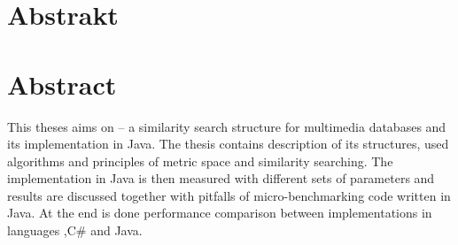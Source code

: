 \section*{Abstrakt}
\section*{Abstract}
This theses aims on \MIndex{} -- a similarity search structure for multimedia databases and its implementation in Java.
The thesis contains description of \MIndex{} its structures, used algorithms and principles of metric space and similarity searching.
The implementation in Java is then measured with different sets of parameters and results are discussed together with pitfalls of micro-benchmarking code written in Java.
At the end is done performance comparison between \MIndex{} implementations in languages \CC,C\# and Java.
\newpage